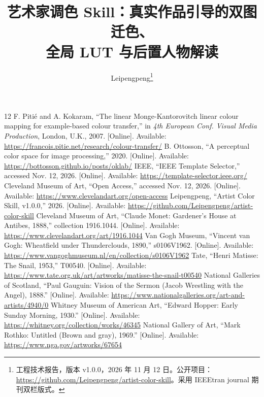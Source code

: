 \documentclass[journal]{IEEEtran}
\begin{document}
\title{艺术家调色 Skill：真实作品引导的双图迁色、\protect\\全局 LUT 与后置人物解读}
\author{Leipengpeng\thanks{工程技术报告，版本 v1.0.0，2026 年 11 月 12 日。公开项目：\url{https://github.com/Leipengpeng/artist-color-skill}。采用 IEEEtran journal 期刊双栏版式。}}
\maketitle

\balance
\begin{thebibliography}{12}
 F. Piti\'e and A. Kokaram, ``The linear Monge-Kantorovitch linear colour mapping for example-based colour transfer,'' in \emph{4th European Conf. Visual Media Production}, London, U.K., 2007. [Online]. Available: \url{https://francois.pitie.net/research/colour-transfer/}
 B. Ottosson, ``A perceptual color space for image processing,'' 2020. [Online]. Available: \url{https://bottosson.github.io/posts/oklab/}
 IEEE, ``IEEE Template Selector,'' accessed Nov. 12, 2026. [Online]. Available: \url{https://template-selector.ieee.org/}
 Cleveland Museum of Art, ``Open Access,'' accessed Nov. 12, 2026. [Online]. Available: \url{https://www.clevelandart.org/open-access}
 Leipengpeng, ``Artist Color Skill, v1.0.0,'' 2026. [Online]. Available: \url{https://github.com/Leipengpeng/artist-color-skill}
 Cleveland Museum of Art, ``Claude Monet: Gardener's House at Antibes, 1888,'' collection 1916.1044. [Online]. Available: \url{https://www.clevelandart.org/art/1916.1044}
 Van Gogh Museum, ``Vincent van Gogh: Wheatfield under Thunderclouds, 1890,'' s0106V1962. [Online]. Available: \url{https://www.vangoghmuseum.nl/en/collection/s0106V1962}
 Tate, ``Henri Matisse: The Snail, 1953,'' T00540. [Online]. Available: \url{https://www.tate.org.uk/art/artworks/matisse-the-snail-t00540}
 National Galleries of Scotland, ``Paul Gauguin: Vision of the Sermon (Jacob Wrestling with the Angel), 1888.'' [Online]. Available: \url{https://www.nationalgalleries.org/art-and-artists/4940/0}
 Whitney Museum of American Art, ``Edward Hopper: Early Sunday Morning, 1930.'' [Online]. Available: \url{https://whitney.org/collection/works/46345}
 National Gallery of Art, ``Mark Rothko: Untitled (Brown and gray), 1969.'' [Online]. Available: \url{https://www.nga.gov/artworks/67654}
\end{thebibliography}
\end{document}
